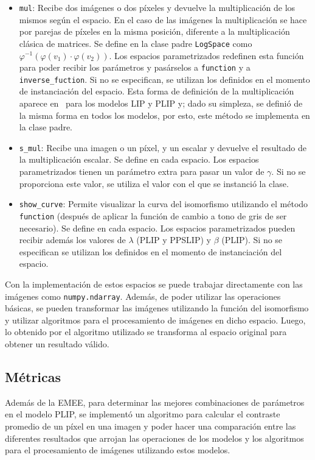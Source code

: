 \begin{itemize}
	\item \verb|mul|: Recibe dos im\'agenes o dos p\'ixeles y devuelve la multiplicaci\'on de los mismos seg\'un el espacio. En el caso de las im\'agenes la multiplicaci\'on se hace por parejas de p\'ixeles en la misma posici\'on, diferente a la multiplicaci\'on cl\'asica de matrices. Se define en la clase padre \verb|LogSpace| como $\varphi^{-1}(\varphi(v_1)\cdot\varphi(v_2))$. Los espacios parametrizados redefinen esta funci\'on para poder recibir los par\'ametros y pas\'arselos a \verb|function| y a \verb|inverse_fuction|. Si no se especifican, se utilizan los definidos en el momento de instanciaci\'on del espacio. Esta forma de definici\'on de la multiplicaci\'on aparece en~\cite{panetta2010parameterized} para los modelos LIP y PLIP y; dado su simpleza, se defini\'o de la misma forma en todos los modelos, por esto, este m\'etodo se implementa en la clase padre.
	\item \verb|s_mul|: Recibe una imagen o un p\'ixel, y un escalar y devuelve el resultado de la multiplicaci\'on escalar. Se define en cada espacio. Los espacios parametrizados tienen un par\'ametro extra para pasar un valor de $\gamma$. Si no se proporciona este valor, se utiliza el valor con el que se instanci\'o la clase.
	\item \verb|show_curve|: Permite visualizar la curva del isomorfismo utilizando el m\'etodo \verb|function| (despu\'es de aplicar la funci\'on de cambio a tono de gris de ser necesario). Se define en cada espacio. Los espacios parametrizados pueden recibir adem\'as los valores de $\lambda$ (PLIP y PPSLIP) y $\beta$ (PLIP). Si no se especifican se utilizan los definidos en el momento de instanciaci\'on del espacio.
\end{itemize}

Con la implementaci\'on de estos espacios se puede trabajar directamente con las im\'agenes como \verb|numpy.ndarray|. Adem\'as, de poder utilizar las operaciones b\'asicas, se pueden transformar las im\'agenes utilizando la funci\'on del isomorfismo y utilizar algoritmos para el procesamiento de im\'agenes en dicho espacio. Luego, lo obtenido por el algoritmo utilizado se transforma al espacio original para obtener un resultado v\'alido.

\subsection{M\'etricas}

Adem\'as de la EMEE, para determinar las mejores combinaciones de par\'ametros en el modelo PLIP, se implement\'o un algoritmo para calcular el contraste promedio de un p\'ixel en una imagen y poder hacer una comparaci\'on entre las diferentes resultados que arrojan las operaciones de los modelos y los algoritmos para el procesamiento de im\'agenes utilizando estos modelos.

